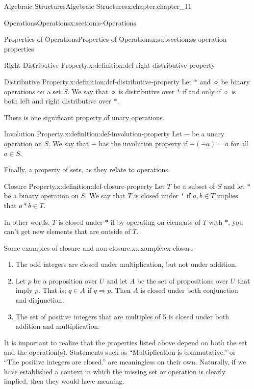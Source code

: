 \documentclass[oneside,10pt,]{book}
\numberwithin{equation}{section}
\begin{document}
\begin{chapterptx}{Algebraic Structures}{}{Algebraic Structures}{}{}{x:chapter:chapter_11}
\begin{sectionptx}{Operations}{}{Operations}{}{}{x:section:s-Operations}
\begin{subsectionptx}{Properties of Operations}{}{Properties of Operations}{}{}{x:subsection:ss-operation-properties}
\begin{definition}{Right Distributive Property.}{x:definition:def-right-distributive-property}
\end{definition}
\begin{definition}{Distributive Property.}{x:definition:def-distributive-property}%
%
Let \(*\) and \(\diamond\) be  binary operations on a set \(S\). We say that \(\diamond\) is distributive over \(*\) if and only if \(\diamond\) is both left and right distributive over \(*\).%
\end{definition}
There is one significant property of unary operations.%
\begin{definition}{Involution Property.}{x:definition:def-involution-property}%
%
Let  \(-\)  be a unary operation on \(S\).  We say that \(-\) has the involution property if \(-(-a) = a\) for all \(a \in  S\).%
\end{definition}
Finally, a property of sets, as they relate to operations.%
\begin{definition}{Closure Property.}{x:definition:def-closure-property}%
%
Let \(T\) be a subset of \(S\) and let \(*\) be a binary operation on  \(S\). We say that \(T\) is closed under \(*\) if \(a, b \in  T\) implies that \(a * b \in  T\).%
\end{definition}
In other words, \(T\) is closed under \(*\) if by operating on elements of \(T\) with \(*\), you can't get new elements that are outside of \(T\).%
\begin{example}{Some examples of closure and non-closure.}{x:example:ex-closure}%
%
\begin{enumerate}[label=(\alph*)]
\item{}The odd integers are closed under multiplication, but not under addition.%
\item{}Let \(p\) be a proposition over \(U\) and let \(A\) be the set of propositions over \(U\) that imply \(p\). That is; \(q \in  A\) if \(q\Rightarrow p\). Then \(A\) is closed under both conjunction and disjunction.%
\item{}The set of positive integers that are multiples of 5 is closed under both addition and multiplication.%
\end{enumerate}
%
\end{example}
It is important to realize that the properties listed above depend on both the set and the operation(s). Statements such as ``Multiplication is commutative.'' or ``The positive integers are closed.'' are meaningless on their own.  Naturally, if we have established a context in which the missing set or operation is clearly implied, then they would have meaning.%

\end{subsectionptx}
\end{sectionptx}
\end{chapterptx}
\end{document}

